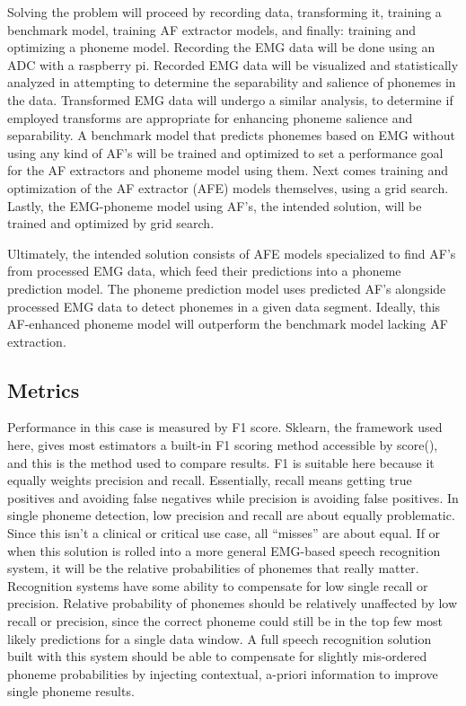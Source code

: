 \documentclass[conference]{IEEEtran}
\begin{document}
Solving the problem will proceed by recording data, transforming it, training a benchmark model, training AF extractor models, and finally: training and optimizing a phoneme model. Recording the EMG data will be done using an ADC with a raspberry pi. Recorded EMG data will be visualized and statistically analyzed in attempting to determine the separability and salience of phonemes in the data. Transformed EMG data will undergo a similar analysis, to determine if employed transforms are appropriate for enhancing phoneme salience and separability. A benchmark model that predicts phonemes based on EMG without using any kind of AF's will be trained and optimized to set a performance goal for the AF extractors and phoneme model using them. Next comes training and optimization of the AF extractor (AFE) models themselves, using a grid search. Lastly, the EMG-phoneme model using AF's, the intended solution, will be trained and optimized by grid search.

Ultimately, the intended solution consists of AFE models specialized to find AF's from processed EMG data, which feed their predictions into a phoneme prediction model. The phoneme prediction model uses predicted AF's alongside processed EMG data to detect phonemes in a given data segment. Ideally, this AF-enhanced phoneme model will outperform the benchmark model lacking AF extraction.

\subsection{Metrics}
Performance in this case is measured by F1 score. Sklearn, the framework used here, gives most estimators a built-in F1 scoring method accessible by score(), and this is the method used to compare results. F1 is suitable here because it equally weights precision and recall. Essentially, recall means getting true positives and avoiding false negatives while precision is avoiding false positives. In single phoneme detection, low precision and recall are about equally problematic. Since this isn't a clinical or critical use case, all “misses” are about equal. If or when this solution is rolled into a more general EMG-based speech recognition system, it will be the relative probabilities of phonemes that really matter. Recognition systems have some ability to compensate for low single recall or precision. Relative probability of phonemes should be relatively unaffected by low recall or precision, since the correct phoneme could still be in the top few most likely predictions for a single data window. A full speech recognition solution built with this system should be able to compensate for slightly mis-ordered phoneme probabilities by injecting contextual, a-priori information to improve single phoneme results.
\end{document}
